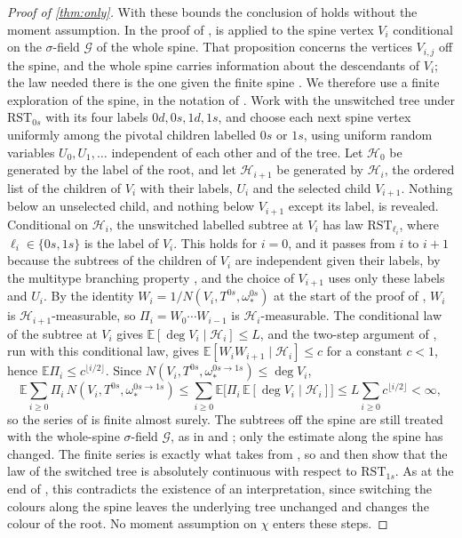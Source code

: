 \documentclass[11pt]{amsart}
\theoremstyle{remark}
\begin{document}
\begin{proof}[Proof of \cref{thm:only}]
With these bounds the conclusion of \cite[Lemma~4.14]{JPS} holds without the moment assumption. In the proof of \cite[Lemma~4.14]{JPS}, \cite[Proposition~4.9(c)]{JPS} is applied to the spine vertex $V_i$ conditional on the $\sigma$-field $\mathcal G$ of the whole spine. That proposition concerns the vertices $V_{i,j}$ off the spine, and the whole spine carries information about the descendants of $V_i$; the law needed there is the one given the finite spine \cite[Proposition~4.9(d)]{JPS}. We therefore use a finite exploration of the spine, in the notation of \cite[Section~4]{JPS}. Work with the unswitched tree under $\mathrm{RST}_{0s}$ with its four labels $0d,0s,1d,1s$, and choose each next spine vertex uniformly among the pivotal children labelled $0s$ or $1s$, using uniform random variables $U_0,U_1,\dots$ independent of each other and of the tree. Let $\mathcal H_0$ be generated by the label of the root, and let $\mathcal H_{i+1}$ be generated by $\mathcal H_i$, the ordered list of the children of $V_i$ with their labels, $U_i$ and the selected child $V_{i+1}$. Nothing below an unselected child, and nothing below $V_{i+1}$ except its label, is revealed. Conditional on $\mathcal H_i$, the unswitched labelled subtree at $V_i$ has law $\mathrm{RST}_{\ell_i}$, where $\ell_i\in\{0s,1s\}$ is the label of $V_i$. This holds for $i=0$, and it passes from $i$ to $i+1$ because the subtrees of the children of $V_i$ are independent given their labels, by the multitype branching property \cite[Proposition~4.1(c)]{JPS}, and the choice of $V_{i+1}$ uses only these labels and $U_i$. By the identity $W_i=1/N(V_i,T^{0s},\omega_*^{0s})$ at the start of the proof of \cite[Lemma~4.12]{JPS}, $W_i$ is $\mathcal H_{i+1}$-measurable, so $\Pi_i=W_0\cdots W_{i-1}$ is $\mathcal H_i$-measurable. The conditional law of the subtree at $V_i$ gives $\mathbb E[\deg V_i\mid\mathcal H_i]\le L$, and the two-step argument of \cite[Lemma~4.12]{JPS}, run with this conditional law, gives $\mathbb E[W_iW_{i+1}\mid\mathcal H_i]\le c$ for a constant $c<1$, hence $\mathbb E \Pi_i\le c^{\lfloor i/2\rfloor}$. Since $N(V_i,T^{0s},\omega_*^{0s\to1s})\le\deg V_i$,
\[
\mathbb E\sum_{i\ge0}\Pi_i\,N(V_i,T^{0s},\omega_*^{0s\to1s})
\le\sum_{i\ge0}\mathbb E\bigl[\Pi_i\,\mathbb E[\deg V_i\mid\mathcal H_i]\bigr]
\le L\sum_{i\ge0}c^{\lfloor i/2\rfloor}<\infty,
\]
so the series of \cite[Lemma~4.14]{JPS} is finite almost surely. The subtrees off the spine are still treated with the whole-spine $\sigma$-field $\mathcal G$, as in \cite[Proposition~4.9(b),(c)]{JPS} and \cite[Lemma~4.11]{JPS}; only the estimate along the spine has changed. The finite series is exactly what \cite[Lemma~4.15]{JPS} takes from \cite[Lemma~4.14]{JPS}, so \cite[Lemma~4.15]{JPS} and then \cite[Lemmas~4.5 and~4.3]{JPS} show that the law of the switched tree is absolutely continuous with respect to $\mathrm{RST}_{1s}$. As at the end of \cite[Section~4]{JPS}, this contradicts the existence of an interpretation, since switching the colours along the spine leaves the underlying tree unchanged and changes the colour of the root. No moment assumption on $\chi$ enters these steps.


\end{proof}
\end{document}
